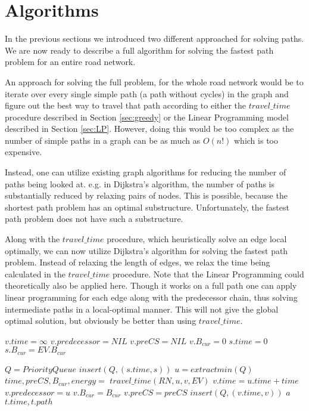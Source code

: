 \section{Algorithms}\label{sec:algo}
In the previous sections we introduced two different approached for solving paths. We are now ready to describe a full algorithm for solving the fastest path problem for an entire road network. 

An approach for solving the full problem, for the whole road network would be to iterate over every single simple path (a path without cycles) in the graph and figure out the best way to travel that path according to either the $travel\_time$ procedure described in Section \ref{sec:greedy} or the Linear Programming model described in Section \ref{sec:LP}. However, doing this would be too complex as the number of simple paths in a graph can be as much as $O(n!)$ which is too expensive.

Instead, one can utilize existing graph algorithms for reducing the number of paths being looked at. e.g. in Dijkstra's algorithm, the number of paths is substantially reduced by relaxing pairs of nodes. This is possible, because the shortest path problem has an optimal substructure. Unfortunately, the fastest path problem does not have such a substructure.

Along with the $travel\_time$ procedure, which heuristically solve an edge local optimally, we can now utilize Dijkstra's algorithm for solving the fastest path problem. Instead of relaxing the length of edges, we relax the time being calculated in the $travel\_time$ procedure. Note that the Linear Programming could theoretically also be applied here. Though it works on a full path one can apply linear programming for each edge along with the predecessor chain, thus solving intermediate paths in a local-optimal manner. This will not give the global optimal solution, but obviously be better than using $travel\_time$.
\begin{algorithmic}[1]
        \State $v.time = \infty$
        \State $v.predecessor = NIL$
        \State $v.preCS = NIL$
        \State $v.B_{cur} = 0$
    \EndFor
    \State $s.time = 0$
    \State $s.B_{cur} = EV.B_{cur}$

    \State $Q = PriorityQueue$
    \State $insert(Q, (s.time, s))$ 
        \State $u = extractmin(Q)$
            \State $time,preCS,B_{cur},energy = $
            \State $travel\_time(RN, u, v, EV)$
                \State $v.time = u.time + time$
                \State $v.predecessor = u$
                \State $v.B_{cur} = B_{cur}$
                \State $v.preCS = preCS$
                \State $insert(Q, (v.time, v))$ 
            \EndIf
                \State $a$
            \EndIf
        \EndFor
    \EndWhile
    \State \Return $t.time, t.path$
\EndFunction
\end{algorithmic}\label{alg:fastest_path}



